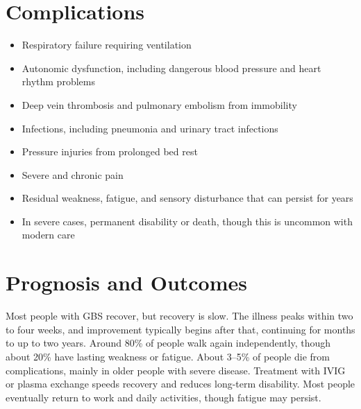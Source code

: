 \section*{Complications}
\begin{itemize}
    \item Respiratory failure requiring ventilation
    \item Autonomic dysfunction, including dangerous blood pressure and heart rhythm problems
    \item Deep vein thrombosis and pulmonary embolism from immobility
    \item Infections, including pneumonia and urinary tract infections
    \item Pressure injuries from prolonged bed rest
    \item Severe and chronic pain
    \item Residual weakness, fatigue, and sensory disturbance that can persist for years
    \item In severe cases, permanent disability or death, though this is uncommon with modern care
\end{itemize}

\section*{Prognosis and Outcomes}
Most people with GBS recover, but recovery is slow. The illness peaks within two to four weeks, and improvement typically begins after that, continuing for months to up to two years. Around 80\% of people walk again independently, though about 20\% have lasting weakness or fatigue. About 3--5\% of people die from complications, mainly in older people with severe disease. Treatment with IVIG or plasma exchange speeds recovery and reduces long-term disability. Most people eventually return to work and daily activities, though fatigue may persist.

